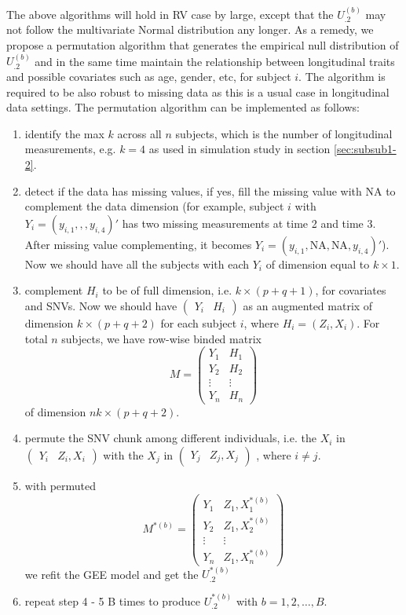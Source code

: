 \documentclass[12pt]{article}
\begin{document}
The above algorithms will hold in RV case by large, except that the $U_{.2}^{ (b) }$ may not follow the multivariate Normal distribution any longer. As a remedy, we propose a permutation algorithm that generates the empirical null distribution of $U_{.2}^{ (b) }$ and in the same time maintain the relationship between longitudinal traits and possible covariates such as age, gender, etc, for subject $i$. The algorithm is required to be also robust to missing data as this is a usual case in longitudinal data settings. The permutation algorithm can be implemented as follows:
\begin{enumerate}
\item identify the max $k$ across all $n$ subjects, which is the number of longitudinal measurements, e.g. $k = 4$ as used in simulation study in section \ref{sec:subsub1-2}.
\item detect if the data has missing values, if yes, fill the missing value with NA to complement the data dimension (for example, subject $i$ with $Y_{i} = ( y_{i,1},,,y_{i,4} )'$ has two missing measurements at time 2 and time 3. After missing value complementing, it becomes $Y_{i} = ( y_{i,1},\textrm{NA},\textrm{NA},y_{i,4} )'$). Now we should have all the subjects with each $Y_{i}$ of dimension equal to $k \times 1$.  
\item complement $H_i$ to be of full dimension, i.e. $k \times (p + q + 1)$, for covariates and SNVs. Now we should have
$\begin{pmatrix}
Y_i & H_i
\end{pmatrix}$
as an augmented matrix of dimension $k \times (p + q + 2)$ for each subject $i$, where $H_i = (Z_i,X_i)$. For total $n$ subjects, we have row-wise binded matrix
$$
M = 
\begin{pmatrix}
Y_1 & H_1\\
Y_2 & H_2\\
\vdots & \vdots\\
Y_n & H_n
\end{pmatrix}
$$ 
of dimension $nk \times (p + q + 2)$.
\item permute the SNV chunk among different individuals, i.e. the $X_i$ in
$\begin{pmatrix}
Y_i & Z_i,X_i
\end{pmatrix}$ 
with the $X_j$ in 
$\begin{pmatrix}
Y_j & Z_j,X_j
\end{pmatrix}$
, where $i \neq j$. 
\item with permuted 
$$
M^{*(b)} = 
\begin{pmatrix}
Y_1 & Z_1, X_1^{*(b)}\\
Y_2 & Z_1, X_2^{*(b)}\\
\vdots & \vdots\\
Y_n & Z_1, X_n^{*(b)}
\end{pmatrix}
$$
we refit the GEE model and get the $ U_{.2}^{ *(b) } $
\item repeat step 4 - 5 B times to produce $U_{.2}^{ *(b) }$ with $b = 1,2,\ldots,B$.
\end{enumerate}
\end{document}
